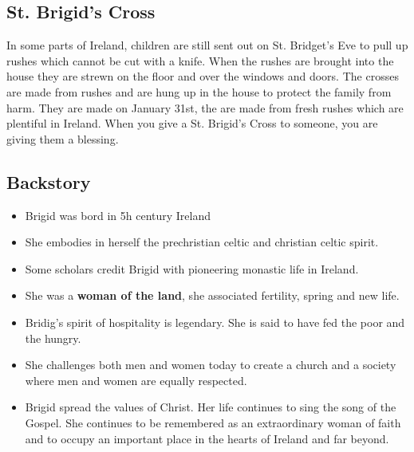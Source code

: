\documentclass[a4paper]{article}
\begin{document}
\subsection{St. Brigid's Cross}

In some parts of Ireland, children are still sent out on St. Bridget's Eve to pull up rushes which cannot be cut with a knife.
When the rushes are brought into the house they are strewn on the floor and over the windows and doors.
The crosses are made from rushes and are hung up in the house to protect the family from harm. They are made on January 31st, the are made from fresh rushes which are plentiful in Ireland.
When you give a St. Brigid's Cross to someone, you are giving them a blessing.

\subsection{Backstory}

\begin{itemize}
    \item Brigid was bord in 5h century Ireland
    \item She embodies in herself the prechristian celtic and christian celtic spirit. 
    \item Some scholars credit Brigid with pioneering monastic life in Ireland. 
    \item She was a \textbf{woman of the land}, she associated fertility, spring and new life.
    \item Bridig's spirit of hospitality is legendary. She is said to have fed the poor and the hungry.
    \item She challenges both men and women today to create a church and a society where men and women are equally respected.
    \item Brigid spread the values of Christ. Her life continues to sing the song of the Gospel. She continues to be remembered as an extraordinary woman of faith and to occupy an important place in the hearts of Ireland and far beyond.
\end{itemize}
\end{document}
